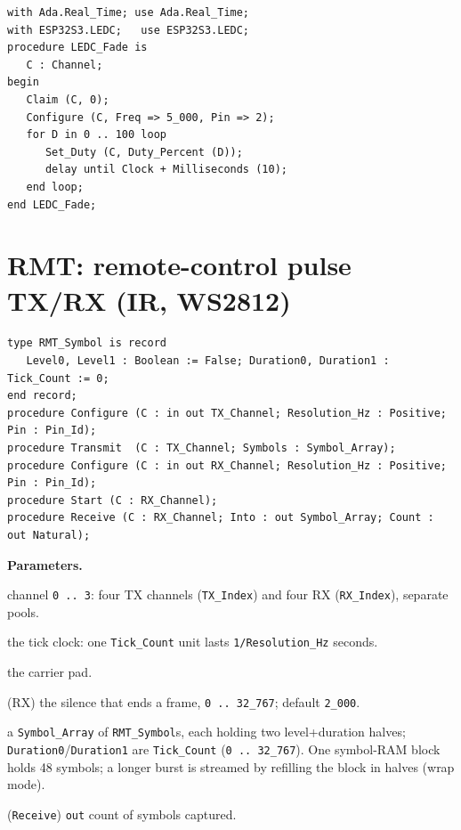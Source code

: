 \begin{lstlisting}
with Ada.Real_Time; use Ada.Real_Time;
with ESP32S3.LEDC;   use ESP32S3.LEDC;
procedure LEDC_Fade is
   C : Channel;
begin
   Claim (C, 0);
   Configure (C, Freq => 5_000, Pin => 2);
   for D in 0 .. 100 loop
      Set_Duty (C, Duty_Percent (D));
      delay until Clock + Milliseconds (10);
   end loop;
end LEDC_Fade;
\end{lstlisting}

\section{RMT: remote-control pulse TX/RX (IR, WS2812)}

\begin{lstlisting}
type RMT_Symbol is record
   Level0, Level1 : Boolean := False; Duration0, Duration1 : Tick_Count := 0;
end record;
procedure Configure (C : in out TX_Channel; Resolution_Hz : Positive; Pin : Pin_Id);
procedure Transmit  (C : TX_Channel; Symbols : Symbol_Array);
procedure Configure (C : in out RX_Channel; Resolution_Hz : Positive; Pin : Pin_Id);
procedure Start (C : RX_Channel);
procedure Receive (C : RX_Channel; Into : out Symbol_Array; Count : out Natural);
\end{lstlisting}

\textbf{Parameters.}
\begin{description}[style=nextline]
\item[\texttt{Index}] channel \texttt{0\,..\,3}: four TX channels
  (\texttt{TX\_Index}) and four RX (\texttt{RX\_Index}), separate pools.
\item[\texttt{Resolution\_Hz}] the tick clock: one \texttt{Tick\_Count} unit lasts
  \texttt{1/Resolution\_Hz} seconds.
\item[\texttt{Pin}] the carrier pad.
\item[\texttt{Idle\_Ticks}] (RX) the silence that ends a frame,
  \texttt{0\,..\,32\_767}; default \texttt{2\_000}.
\item[\texttt{Symbols} / \texttt{Into}] a \texttt{Symbol\_Array} of
  \texttt{RMT\_Symbol}s, each holding two level+duration halves;
  \texttt{Duration0}/\allowbreak\texttt{Duration1} are \texttt{Tick\_Count}
  (\texttt{0\,..\,32\_767}). One symbol-RAM block holds 48 symbols; a longer burst
  is streamed by refilling the block in halves (wrap mode).
\item[\texttt{Count}] (\texttt{Receive}) \texttt{out} count of symbols captured.
\end{description}

